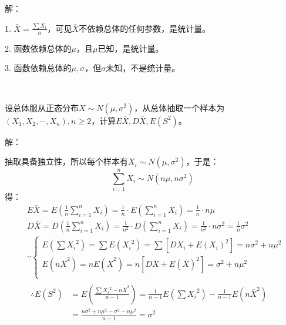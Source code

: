 解：

1. $\bar{X}=\frac{\sum{X_i}}{n}$，可见$\bar{X}$不依赖总体的任何参数，是统计量。

2. 函数依赖总体的$\mu $，且$\mu $已知，是统计量。

3. 函数依赖总体的$\mu ,\sigma $，但$\sigma $未知，不是统计量。

~

\begin{example}
设总体服从正态分布$X\sim N\left( \mu ,\sigma ^2 \right) $，从总体抽取一个样本为$\left( X_1,X_2,\cdots ,X_n \right) ,n\geqslant 2$，计算$E\bar{X},D\bar{X},E\left( S^2 \right) $。
\end{example}

解：

抽取具备独立性，所以每个样本有$X_i\sim N\left( \mu ,\sigma ^2 \right) $，于是：
\[
\sum_{i=1}^n{X_i}\sim N\left( n\mu ,n\sigma ^2 \right)
\]
得：
\begin{align*}
&E\bar{X}=E\left( \frac{1}{n}\sum_{i=1}^n{X_i} \right) =\frac{1}{n}\cdot E\left( \sum_{i=1}^n{X_i} \right) =\frac{1}{n}\cdot n\mu \\
&D\bar{X}=D\left( \frac{1}{n}\sum_{i=1}^n{X_i} \right) =\frac{1}{n^2}\cdot D\left( \sum_{i=1}^n{X_i} \right) =\frac{1}{n^2}\cdot n\sigma ^2=\frac{1}{n}\sigma ^2 \\
&\because \begin{cases}
	E\left( \sum{{X_i}^2} \right) =\sum{E\left( {X_i}^2 \right)}=\sum{\left[ DX_i+E\left( X_i \right) ^2 \right]}=n\sigma ^2+n\mu ^2\\
	E\left( n\bar{X}^2 \right) =nE\left( \bar{X}^2 \right) =n\left[ D\bar{X}+E\left( \bar{X} \right) ^2 \right] =\sigma ^2+n\mu ^2\\
\end{cases} \\
&\begin{aligned}
	\therefore E\left( S^2 \right) &=E\left( \frac{\sum{{X_i}^2}-n\bar{X}^2}{n-1} \right) =\frac{1}{n-1}E\left( \sum{{X_i}^2} \right) -\frac{1}{n-1}E\left( n\bar{X}^2 \right)\\
	&=\frac{n\sigma ^2+n\mu ^2-\sigma ^2-n\mu ^2}{n-1}=\sigma ^2\\
\end{aligned}
\end{align*}




